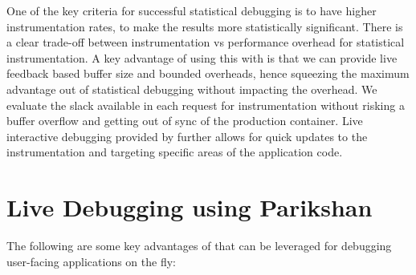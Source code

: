 One of the key criteria for successful statistical debugging is to have higher instrumentation rates, to make the results more statistically significant. 
There is a clear trade-off between instrumentation vs performance overhead for statistical instrumentation. 
A key advantage of using this with \parikshan is that we can provide live feedback based buffer size and bounded overheads, hence squeezing the maximum advantage out of statistical debugging without impacting the overhead. 
We evaluate the slack available in each request for instrumentation without risking a buffer overflow and getting out of sync of the production container.
Live interactive debugging provided by \parikshan further allows for quick updates to the instrumentation and targeting specific areas of the application code.
\fi

\section{Live Debugging using Parikshan}
\label{sec:guidedDiscussion}

The following are some key advantages of \parikshan that can be leveraged for debugging user-facing applications on the fly:

